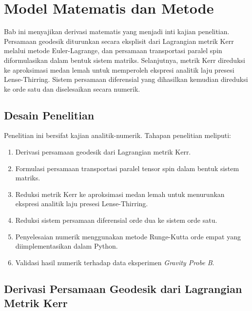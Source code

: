 
\chapter{Model Matematis dan Metode}
\label{chap:metode}

Bab ini menyajikan derivasi matematis yang menjadi inti kajian penelitian.
Persamaan geodesik diturunkan secara eksplisit dari Lagrangian metrik Kerr
melalui metode Euler-Lagrange, dan persamaan transportasi paralel spin
diformulasikan dalam bentuk sistem matriks.
Selanjutnya, metrik Kerr direduksi ke aproksimasi medan lemah
untuk memperoleh ekspresi analitik laju presesi Lense-Thirring.
Sistem persamaan diferensial yang dihasilkan kemudian direduksi ke orde satu
dan diselesaikan secara numerik.


\section{Desain Penelitian}
\label{sec:desain}

Penelitian ini bersifat kajian analitik-numerik.
Tahapan penelitian meliputi:
\begin{enumerate}
    \item Derivasi persamaan geodesik dari Lagrangian metrik Kerr.
    \item Formulasi persamaan transportasi paralel tensor spin
          dalam bentuk sistem matriks.
    \item Reduksi metrik Kerr ke aproksimasi medan lemah
          untuk menurunkan ekspresi analitik laju presesi Lense-Thirring.
    \item Reduksi sistem persamaan diferensial orde dua ke sistem orde satu.
    \item Penyelesaian numerik menggunakan metode Runge-Kutta orde empat
          yang diimplementasikan dalam Python.
    \item Validasi hasil numerik terhadap data eksperimen \textit{Gravity Probe B}.
\end{enumerate}



\section{Derivasi Persamaan Geodesik dari Lagrangian Metrik Kerr}
\label{sec:derivasi-geodesik}

